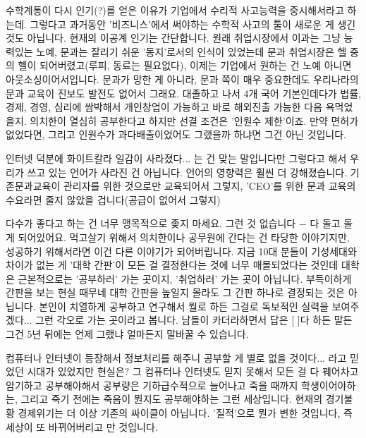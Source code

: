 수학계통이 다시 인기(?)를 얻은 이유가 기업에서 수리적 사고능력을 중시해서라고 하는데.
그렇다고 과거동안 '비즈니스'에서 써야하는 수학적 사고의 툴이 새로운 게 생긴 것도 아닙니다.
현재의 이공계 인기는 간단합니다.
원래 취업시장에서 이과는 그냥 능력있는 노예, 문과는 잘리기 쉬운 '동지'로서의 인식이 있었는데
문과 취업시장은 헬 중의 헬이 되어버렸고(루피, 동료는 필요없다), 이제는 기업에서 원하는 건 노예 아니면 아웃소싱이어서입니다.
문과가 망한 게 아니라, 문과 쪽이 매우 중요한데도 우리나라의 문과 교육이 진보도 발전도 없어서 그래요.
대졸하고 나서 4개 국어 기본인데다가 법률, 경제, 경영, 심리에 쌈박해서 개인창업이 가능하고 바로 해외진출 가능한 다음 욕먹었을지.
의치한이 열심히 공부한다고 하지만 선결 조건은 '인원수 제한'이죠.
만약 면허가 없었다면, 그리고 인원수가 과다배출이었어도 그랬을까 하냐면 그건 아닌 것입니다.
\vspace{5mm}

인터넷 덕분에 화이트칼라 일감이 사라졌다... 는 건 맞는 말입니다만
그렇다고 해서 우리가 쓰고 있는 언어가 사라진 건 아닙니다. 언어의 영향력은 훨씬 더 강해졌습니다.
기존문과교육이 관리자를 위한 것으로만 교육되어서 그렇지, 'CEO'를 위한 문과 교육의 수요라면 줄지 않았을 겁니다(공급이 없어서 그렇지)
\vspace{5mm}

다수가 좋다고 하는 건 너무 맹목적으로 좆지 마세요. 그런 것 없습니다 $-$ 다 돌고 돌게 되어있어요.
먹고살기 위해서 의치한이나 공무원에 간다는 건 타당한 이야기지만, 성공하기 위해서라면 이건 다른 이야기가 되어버립니다.
지금 10대 분들이 기성세대와 차이가 없는 게 '대학 간판'이 모든 걸 결정한다는 것에 너무 매몰되었다는 것인데
대학은 근본적으로는 '공부하러' 가는 곳이지, '취업하러' 가는 곳이 아닙니다.
부득이하게 간판을 보는 현실 때무네 대학 간판을 높일지 몰라도 그 간판 하나로 결정되는 것은 아닙니다.
본인이 치열하게 공부하고 연구해서 뭘로 하든 그걸로 독보적인 실력을 보여주겠다... 그런 각오로 가는 곳이라고 봅니다.
남들이 카더라하면서 답은 [   ]다 하든 말든 그건 5년 뒤에는 언제 그랬냐 얼마든지 말바꿀 수 있습니다.
\vspace{5mm}

컴퓨터나 인터넷이 등장해서 정보처리를 해주니 공부할 게 별로 없을 것이다... 라고 믿었던 시대가 있었지만 현실은?
그 컴퓨터나 인터넷도 믿지 못해서 모든 걸 다 꿰어차고 암기하고 공부해야해서 공부량은 기하급수적으로 늘어나고
죽을 때까지 학생이어야하는, 그리고 죽기 전에는 죽음이 뭔지도 공부해야하는 그런 세상입니다.
현재의 경기불황 경제위기는 더 이상 기존의 싸이클이 아닙니다.
'질적'으로 뭔가 변한 것입니다, 즉 세상이 또 바뀌어버리고 만 것입니다.
\vspace{5mm}

